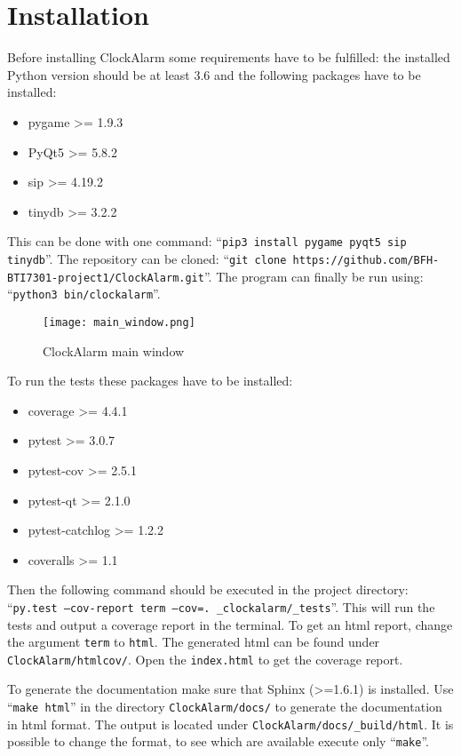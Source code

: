 \chapter{Installation}\label{ch:installation}

Before installing ClockAlarm some requirements have to be fulfilled: the
installed Python version should be at least 3.6 and the following packages have
to be installed:

\begin{itemize}
    \item pygame >= 1.9.3
    \item PyQt5 >= 5.8.2 
    \item sip >= 4.19.2
    \item tinydb >= 3.2.2 
\end{itemize}

This can be done with one command: ``\texttt{pip3 install pygame pyqt5 sip
tinydb}''.
The repository can be cloned: ``\texttt{git clone
https://github.com/BFH-BTI7301-project1/ClockAlarm.git}''.
The program can finally be run using: ``\texttt{python3 bin/clockalarm}''.

\begin{figure}[h]
    \centering
    \caption{ClockAlarm main window}
    \texttt{[image: main\_window.png]}
\end{figure}

To run the tests these packages have to be installed:

\begin{itemize}
    \item coverage >= 4.4.1
    \item pytest >= 3.0.7
    \item pytest-cov >= 2.5.1
    \item pytest-qt >= 2.1.0
    \item pytest-catchlog >= 1.2.2
    \item coveralls >= 1.1
\end{itemize}

Then the following command should be executed in the project directory:
``\texttt{py.test --cov-report term --cov=. \_clockalarm/\_tests}''. This will
run the tests and output a coverage report in the terminal. To get an html
report, change the argument \texttt{term} to \texttt{html}. The generated html
can be found under \texttt{ClockAlarm/htmlcov/}. Open the \texttt{index.html} to
get the coverage report.

To generate the documentation make sure that Sphinx (>=1.6.1) is installed. Use
``\texttt{make html}'' in the directory \texttt{ClockAlarm/docs/} to generate the
documentation in html format. The output is located under
\texttt{ClockAlarm/docs/\_build/html}. It is possible to change the format, to
see which are available execute only ``\texttt{make}''.
